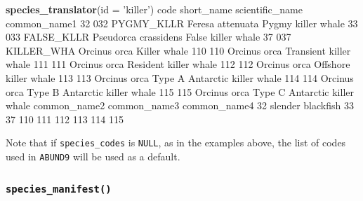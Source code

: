 \documentclass[
]{book}
\newenvironment{Shaded}{\begin{snugshade}}{\end{snugshade}}
\newcommand{\DataTypeTok}[1]{\textcolor[rgb]{0.13,0.29,0.53}{#1}}
\newcommand{\DecValTok}[1]{\textcolor[rgb]{0.00,0.00,0.81}{#1}}
\newcommand{\KeywordTok}[1]{\textcolor[rgb]{0.13,0.29,0.53}{\textbf{#1}}}
\newcommand{\NormalTok}[1]{#1}
\newcommand{\StringTok}[1]{\textcolor[rgb]{0.31,0.60,0.02}{#1}}
\begin{document}
\begin{Shaded}
\begin{Highlighting}[]
\KeywordTok{species_translator}\NormalTok{(}\DataTypeTok{id =} \StringTok{'killer'}\NormalTok{)}
\NormalTok{    code short_name      scientific_name                  common_name1}
\DecValTok{32}   \DecValTok{032}\NormalTok{ PYGMY_KLLR     Feresa attenuata            Pygmy killer whale}
\DecValTok{33}   \DecValTok{033}\NormalTok{ FALSE_KLLR Pseudorca crassidens            False killer whale}
\DecValTok{37}   \DecValTok{037}\NormalTok{ KILLER_WHA         Orcinus orca                  Killer whale}
\DecValTok{110}  \DecValTok{110}\NormalTok{                    Orcinus orca        Transient killer whale}
\DecValTok{111}  \DecValTok{111}\NormalTok{                    Orcinus orca         Resident killer whale}
\DecValTok{112}  \DecValTok{112}\NormalTok{                    Orcinus orca         Offshore killer whale}
\DecValTok{113}  \DecValTok{113}\NormalTok{                    Orcinus orca Type A Antarctic killer whale}
\DecValTok{114}  \DecValTok{114}\NormalTok{                    Orcinus orca Type B Antarctic killer whale}
\DecValTok{115}  \DecValTok{115}\NormalTok{                    Orcinus orca Type C Antarctic killer whale}
\NormalTok{          common_name2 common_name3 common_name4}
\DecValTok{32}\NormalTok{   slender blackfish                          }
\DecValTok{33}                                              
\DecValTok{37}                                              
\DecValTok{110}                                             
\DecValTok{111}                                             
\DecValTok{112}                                             
\DecValTok{113}                                             
\DecValTok{114}                                             
\DecValTok{115}                                             
\end{Highlighting}
\end{Shaded}

Note that if \texttt{species\_codes} is \texttt{NULL}, as in the examples above, the list of codes used in \texttt{ABUND9} will be used as a default.

\hypertarget{species_manifest}{%
\subsubsection*{\texorpdfstring{\texttt{species\_manifest()}}{species\_manifest()}}\label{species_manifest}}
\end{document}
